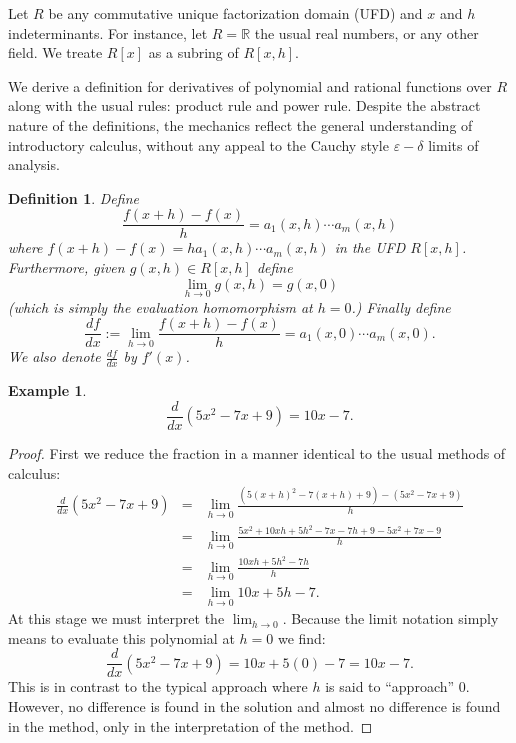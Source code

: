\documentclass[12pt]{article}
\newtheorem{example}{Example}
\newtheorem{defn}[thm]{Definition}
\begin{document}
Let $R$ be any commutative unique factorization domain (UFD) and $x$ and $h$ indeterminants.  For instance, let $R=\mathbb{R}$ the usual real numbers, or any other field.  We treate $R[x]$ as a subring of $R[x,h]$.

We derive a definition for derivatives of polynomial and rational functions over $R$ along with the usual rules: product rule and power rule.  Despite the abstract nature of the definitions, the mechanics reflect the general understanding of introductory calculus, without any appeal to the Cauchy style $\varepsilon-\delta$ limits of analysis.

\begin{defn}
Define
\[\frac{f(x+h)-f(x)}{h}=a_1(x,h)\cdots a_m(x,h)\]
where $f(x+h)-f(x)=h a_1(x,h)\cdots a_m(x,h)$ in the UFD $R[x,h]$.
Furthermore, given $g(x,h)\in R[x,h]$ define 
\[\lim_{h\rightarrow 0} g(x,h)=g(x,0)\]
(which is simply the evaluation homomorphism at $h=0$.)
Finally define
\[\frac{df}{dx}:=\lim_{h\rightarrow 0}\frac{f(x+h)-f(x)}{h}
=a_1(x,0)\cdots a_m(x,0).\]
We also denote $\frac{df}{dx}$ by $f'(x)$.
\end{defn}

\begin{example}
\[\frac{d}{dx}(5x^2-7x+9)=10x-7.\]
\end{example}
\begin{proof}
First we reduce the fraction in a manner identical to the usual methods of 
calculus:
\begin{eqnarray*}
\frac{d}{dx}(5x^2-7x+9) 
 & = & \lim_{h\rightarrow 0}\frac{(5(x+h)^2-7(x+h)+9)-(5x^2-7x+9)}{h}\\
 & = & \lim_{h\rightarrow 0}\frac{5x^2+10xh+5h^2-7x-7h+9-5x^2+7x-9}{h}\\
 & = & \lim_{h\rightarrow 0}\frac{10xh+5h^2-7h}{h} \\
 & = & \lim_{h\rightarrow 0}10x+5h-7.
\end{eqnarray*}
At this stage we must interpret the $\lim_{h\rightarrow 0}$.  Because the 
limit notation simply means to evaluate this polynomial at $h=0$ we find:
\[\frac{d}{dx}(5x^2-7x+9)=10x+5(0)-7=10x-7.\]
This is in contrast to the typical approach where $h$ is said to ``approach''
$0$.  However, no difference is found in the solution and almost no difference
is found in the method, only in the interpretation of the method.
\end{proof}
\end{document}
